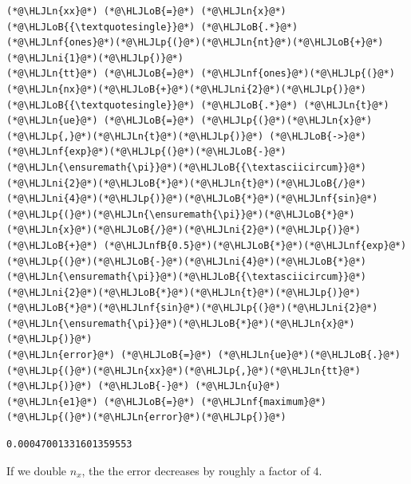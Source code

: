 \documentclass[12pt,a4paper]{article}
\newcommand{\HLJLn}[1]{#1}
\newcommand{\HLJLnf}[1]{\textcolor[RGB]{66,102,213}{#1}}
\newcommand{\HLJLnfB}[1]{\textcolor[RGB]{59,151,46}{#1}}
\newcommand{\HLJLni}[1]{\textcolor[RGB]{59,151,46}{#1}}
\newcommand{\HLJLoB}[1]{\textcolor[RGB]{102,102,102}{\textbf{#1}}}
\newcommand{\HLJLp}[1]{#1}
\begin{document}
\begin{lstlisting}
(*@\HLJLn{xx}@*) (*@\HLJLoB{=}@*) (*@\HLJLn{x}@*)(*@\HLJLoB{{\textquotesingle}}@*) (*@\HLJLoB{.*}@*) (*@\HLJLnf{ones}@*)(*@\HLJLp{(}@*)(*@\HLJLn{nt}@*)(*@\HLJLoB{+}@*)(*@\HLJLni{1}@*)(*@\HLJLp{)}@*)
(*@\HLJLn{tt}@*) (*@\HLJLoB{=}@*) (*@\HLJLnf{ones}@*)(*@\HLJLp{(}@*)(*@\HLJLn{nx}@*)(*@\HLJLoB{+}@*)(*@\HLJLni{2}@*)(*@\HLJLp{)}@*)(*@\HLJLoB{{\textquotesingle}}@*) (*@\HLJLoB{.*}@*) (*@\HLJLn{t}@*)
(*@\HLJLn{ue}@*) (*@\HLJLoB{=}@*) (*@\HLJLp{(}@*)(*@\HLJLn{x}@*)(*@\HLJLp{,}@*)(*@\HLJLn{t}@*)(*@\HLJLp{)}@*) (*@\HLJLoB{->}@*) (*@\HLJLnf{exp}@*)(*@\HLJLp{(}@*)(*@\HLJLoB{-}@*)(*@\HLJLn{\ensuremath{\pi}}@*)(*@\HLJLoB{{\textasciicircum}}@*)(*@\HLJLni{2}@*)(*@\HLJLoB{*}@*)(*@\HLJLn{t}@*)(*@\HLJLoB{/}@*)(*@\HLJLni{4}@*)(*@\HLJLp{)}@*)(*@\HLJLoB{*}@*)(*@\HLJLnf{sin}@*)(*@\HLJLp{(}@*)(*@\HLJLn{\ensuremath{\pi}}@*)(*@\HLJLoB{*}@*)(*@\HLJLn{x}@*)(*@\HLJLoB{/}@*)(*@\HLJLni{2}@*)(*@\HLJLp{)}@*) (*@\HLJLoB{+}@*) (*@\HLJLnfB{0.5}@*)(*@\HLJLoB{*}@*)(*@\HLJLnf{exp}@*)(*@\HLJLp{(}@*)(*@\HLJLoB{-}@*)(*@\HLJLni{4}@*)(*@\HLJLoB{*}@*)(*@\HLJLn{\ensuremath{\pi}}@*)(*@\HLJLoB{{\textasciicircum}}@*)(*@\HLJLni{2}@*)(*@\HLJLoB{*}@*)(*@\HLJLn{t}@*)(*@\HLJLp{)}@*)(*@\HLJLoB{*}@*)(*@\HLJLnf{sin}@*)(*@\HLJLp{(}@*)(*@\HLJLni{2}@*)(*@\HLJLn{\ensuremath{\pi}}@*)(*@\HLJLoB{*}@*)(*@\HLJLn{x}@*)(*@\HLJLp{)}@*)
(*@\HLJLn{error}@*) (*@\HLJLoB{=}@*) (*@\HLJLn{ue}@*)(*@\HLJLoB{.}@*)(*@\HLJLp{(}@*)(*@\HLJLn{xx}@*)(*@\HLJLp{,}@*)(*@\HLJLn{tt}@*)(*@\HLJLp{)}@*) (*@\HLJLoB{-}@*) (*@\HLJLn{u}@*) 
(*@\HLJLn{e1}@*) (*@\HLJLoB{=}@*) (*@\HLJLnf{maximum}@*)(*@\HLJLp{(}@*)(*@\HLJLn{error}@*)(*@\HLJLp{)}@*)
\end{lstlisting}

\begin{lstlisting}
0.00047001331601359553
\end{lstlisting}


If we double $n_x$, the the error decreases by roughly a factor of $4$.
\end{document}
